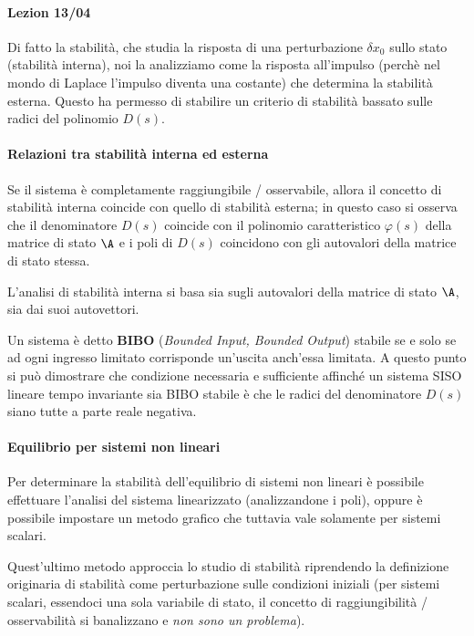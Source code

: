 		\paragraph{Lezion 13/04} Di fatto la stabilità, che studia la risposta di una perturbazione $\delta x_0$ sullo stato (stabilità interna), noi la analizziamo come la risposta all'impulso (perchè nel mondo di Laplace l'impulso diventa una costante) che determina la stabilità esterna. Questo ha permesso di stabilire un criterio di stabilità bassato sulle radici del polinomio $D(s)$.
		
		\paragraph{Relazioni tra stabilità interna ed esterna} Se il sistema è completamente raggiungibile / osservabile, allora il concetto di stabilità interna coincide con quello di stabilità esterna; in questo caso si osserva che il denominatore $D(s)$ coincide con il polinomio caratteristico $\varphi(s)$ della matrice di stato $\A$ e i poli di $D(s)$ coincidono con gli autovalori della matrice di stato stessa.
		
		L'analisi di stabilità interna si basa sia sugli autovalori della matrice di stato $\A$, sia dai suoi autovettori.
		
		Un sistema è detto \textbf{BIBO} (\textit{Bounded Input, Bounded Output}) stabile se e solo se ad ogni ingresso limitato corrisponde un'uscita anch'essa limitata. A questo punto si può dimostrare che condizione necessaria e sufficiente affinché un sistema SISO lineare tempo invariante sia BIBO stabile è che le radici del denominatore $D(s)$ siano tutte a parte reale negativa.
		
		\paragraph{Equilibrio per sistemi non lineari} Per determinare la stabilità dell'equilibrio di sistemi non lineari è possibile effettuare l'analisi del sistema linearizzato (analizzandone i poli), oppure è possibile impostare un metodo grafico che tuttavia vale solamente per sistemi scalari.
		
		Quest'ultimo metodo approccia lo studio di stabilità riprendendo la definizione originaria di stabilità come perturbazione sulle condizioni iniziali (per sistemi scalari, essendoci una sola variabile di stato, il concetto di raggiungibilità / osservabilità si banalizzano e \textit{non sono un problema}).
		
